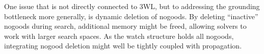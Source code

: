 \documentclass{vutinfth} %
\begin{document}
One issue that is not directly connected to 3WL, but to addressing the grounding bottleneck more generally, is dynamic deletion of nogoods. By deleting \enquote{inactive} nogoods during search, additional memory might be freed, allowing solvers to work with larger search spaces. As the watch structure holds all nogoods, integrating nogood deletion might well be tightly coupled with propagation.

\backmatter

\listoffigures %

\listoftables %

\listofalgorithms
{}

\printindex


%


\end{document}
